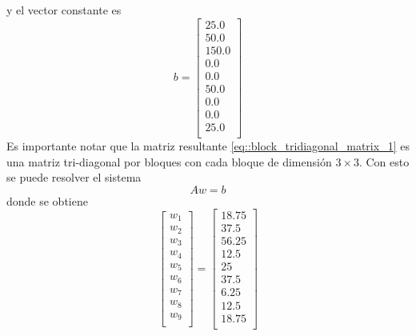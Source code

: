\documentclass[a4paper]{article}
\begin{document}
y el vector constante es 
\begin{equation*}
b =
\begin{bmatrix}
25.0 \\
50.0 \\
150.0 \\
0.0 \\
0.0 \\
50.0 \\
0.0 \\
0.0 \\
25.0 \\
\end{bmatrix}
\end{equation*}
Es importante notar que la matriz resultante \ref{eq::block_tridiagonal_matrix_1} es una matriz tri-diagonal por bloques con cada bloque de dimensión $3\times 3$. Con esto se puede resolver el sistema
\begin{equation}
Aw=b
\end{equation}
donde se obtiene
\begin{equation}
\begin{bmatrix}
w_1 \\
w_2 \\
w_3 \\
w_4 \\
w_5 \\
w_6 \\
w_7 \\
w_8 \\
w_9 \\
\end{bmatrix}=
\begin{bmatrix}
18.75 \\
37.5 \\
56.25 \\
12.5 \\
25 \\
37.5 \\
6.25 \\
12.5 \\
18.75 \\
\end{bmatrix}
\end{equation}
\end{document}
